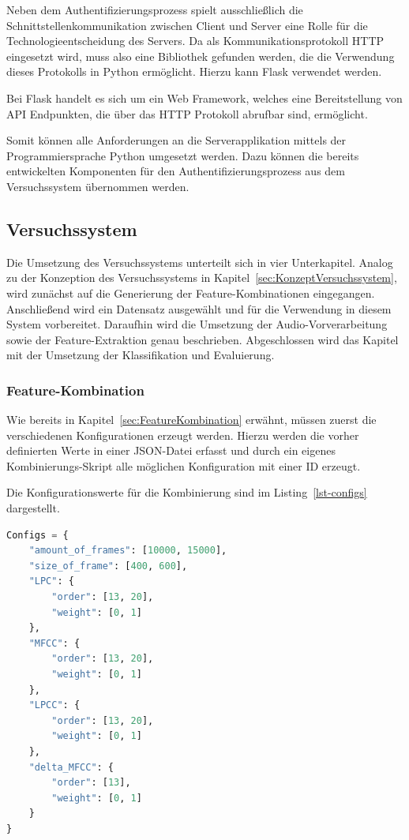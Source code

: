 Neben dem Authentifizierungsprozess spielt ausschließlich die Schnittstellenkommunikation zwischen Client und Server eine Rolle für die Technologieentscheidung des Servers.
Da als Kommunikationsprotokoll HTTP eingesetzt wird, muss also eine Bibliothek gefunden werden, die die Verwendung dieses Protokolls in Python ermöglicht.
Hierzu kann Flask verwendet werden.

Bei Flask handelt es sich um ein Web Framework, welches eine Bereitstellung von \ac{API} Endpunkten, die über das \ac{HTTP} Protokoll abrufbar sind, ermöglicht.

Somit können alle Anforderungen an die Serverapplikation mittels der Programmiersprache Python umgesetzt werden.
Dazu können die bereits entwickelten Komponenten für den Authentifizierungsprozess aus dem Versuchssystem übernommen werden.

\subsection{Versuchssystem}\label{sec:UmsetzungVersuchssystem}

\textauthor{\vJB,}{\vLB}{}

Die Umsetzung des Versuchssystems unterteilt sich in vier Unterkapitel.
Analog zu der Konzeption des Versuchssystems in Kapitel~\ref{sec:KonzeptVersuchssystem}, wird zunächst auf die Generierung der Feature-Kombinationen eingegangen.
Anschließend wird ein Datensatz ausgewählt und für die Verwendung in diesem System vorbereitet.
Daraufhin wird die Umsetzung der Audio-Vorverarbeitung sowie der Feature-Extraktion genau beschrieben.
Abgeschlossen wird das Kapitel mit der Umsetzung der Klassifikation und Evaluierung.

\subsubsection{Feature-Kombination}

\textauthor{\vLB}{}{}

Wie bereits in Kapitel~\ref{sec:FeatureKombination} erwähnt, müssen zuerst die verschiedenen Konfigurationen erzeugt werden.
Hierzu werden die vorher definierten Werte in einer JSON-Datei erfasst und durch ein eigenes Kombinierungs-Skript alle möglichen Konfiguration mit einer ID erzeugt.

Die Konfigurationswerte für die Kombinierung sind im Listing~\ref{lst-configs} dargestellt.

\begin{lstlisting}[language=Python,caption=Konfigurationsmöglichkeiten,label=lst-configs]
Configs = {
    "amount_of_frames": [10000, 15000],
    "size_of_frame": [400, 600],
    "LPC": {
        "order": [13, 20],
        "weight": [0, 1]
    },
    "MFCC": {
        "order": [13, 20],
        "weight": [0, 1]
    },
    "LPCC": {
        "order": [13, 20],
        "weight": [0, 1]
    },
    "delta_MFCC": {
        "order": [13],
        "weight": [0, 1]
    }
}
\end{lstlisting}

